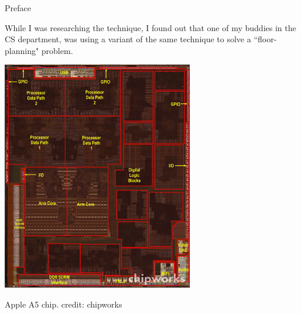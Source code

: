 \documentclass[xcolor=dvipsnames,onlymath,12pt,handout]{beamer}
\begin{document}
\begin{frame}{Preface}

While I was researching the technique, I found out that one of my buddies in the CS department, was using a variant of the same technique to solve a ``floor-planning" problem.

\begin{center}
\includegraphics[scale=0.3]{figs/a5_fp}
\par
Apple A5 chip. credit: chipworks
\end{center}


\end{frame}
\end{document}
